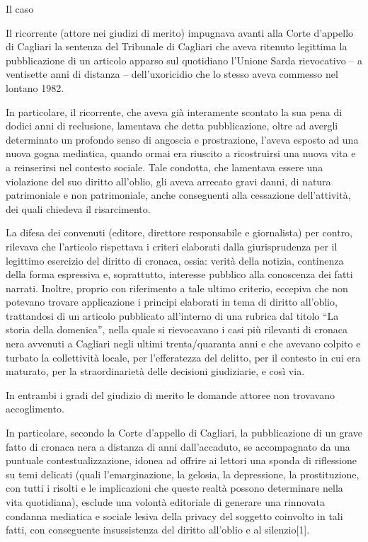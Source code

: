 Il caso

Il ricorrente (attore nei giudizi di merito) impugnava avanti alla Corte d’appello di Cagliari la sentenza del Tribunale di Cagliari che aveva ritenuto legittima la pubblicazione di un articolo apparso sul quotidiano l’Unione Sarda rievocativo – a ventisette anni di distanza – dell’uxoricidio che lo stesso aveva commesso nel lontano 1982.

In particolare, il ricorrente, che aveva già interamente scontato la sua pena di dodici anni di reclusione, lamentava che detta pubblicazione, oltre ad avergli determinato un profondo senso di angoscia e prostrazione, l’aveva esposto ad una nuova gogna mediatica, quando ormai era riuscito a ricostruirsi una nuova vita e a reinserirsi nel contesto sociale. Tale condotta, che lamentava essere una violazione del suo diritto all’oblio, gli aveva arrecato gravi danni, di natura patrimoniale e non patrimoniale, anche conseguenti alla cessazione dell’attività, dei quali chiedeva il risarcimento.

La difesa dei convenuti (editore, direttore responsabile e giornalista) per contro, rilevava che l’articolo rispettava i criteri elaborati dalla giurisprudenza per il legittimo esercizio del diritto di cronaca, ossia: verità della notizia, continenza della forma espressiva e, soprattutto, interesse pubblico alla conoscenza dei fatti narrati. Inoltre, proprio con riferimento a tale ultimo criterio, eccepiva che non potevano trovare applicazione i principi elaborati in tema di diritto all’oblio, trattandosi di un articolo pubblicato all’interno di una rubrica dal titolo “La storia della domenica”, nella quale si rievocavano i casi più rilevanti di cronaca nera avvenuti a Cagliari negli ultimi trenta/quaranta anni e che avevano colpito e turbato la collettività locale, per l’efferatezza del delitto, per il contesto in cui era maturato, per la straordinarietà delle decisioni giudiziarie, e così via.

In entrambi i gradi del giudizio di merito le domande attoree non trovavano accoglimento.

In particolare, secondo la Corte d’appello di Cagliari, la pubblicazione di un grave fatto di cronaca nera a distanza di anni dall’accaduto, se accompagnato da una puntuale contestualizzazione, idonea ad offrire ai lettori una sponda di riflessione su temi delicati (quali l’emarginazione, la gelosia, la depressione, la prostituzione, con tutti i risolti e le implicazioni che queste realtà possono determinare nella vita quotidiana), esclude una volontà editoriale di generare una rinnovata condanna mediatica e sociale lesiva della privacy del soggetto coinvolto in tali fatti, con conseguente insussistenza del diritto all’oblio e al silenzio[1].

